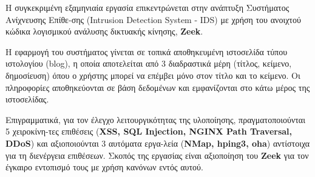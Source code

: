 Η συγκεκριμένη εξαμηνιαία εργασία επικεντρώνεται στην ανάπτυξη Συστήματος Ανίχνευσης Επίθε-σης (Intrusion Detection System - IDS) με χρήση του ανοιχτού κώδικα λογισμικού ανάλυσης δικτυακής κίνησης, \textbf{Zeek}. 

Η εφαρμογή του συστήματος γίνεται σε τοπικά αποθηκευμένη ιστοσελίδα τύπου ιστολογίου (blog), η οποία αποτελείται από 3 διαδραστικά μέρη (τίτλος, κείμενο, δημοσίευση) όπου ο χρήστης μπορεί να επέμβει μόνο στον τίτλο και το κείμενο. Οι πληροφορίες αποθηκεύονται σε βάση δεδομένων και εμφανίζονται στο κάτω μέρος της ιστοσελίδας. 

Επιγραμματικά, για τον έλεγχο λειτουργικότητας της υλοποίησης, πραγματοποιούνται 5 χειροκίνη-τες επιθέσεις (\textbf{XSS, SQL Injection, NGINX Path Traversal, DDoS}) και αξιοποιούνται 3 αυτόματα εργα-λεία (\textbf{NMap, hping3, oha}) αντίστοιχα για τη διενέργεια επιθέσεων. Σκοπός της εργασίας είναι αξιοποίηση του \textbf{Zeek} για τον έγκαιρο εντοπισμό τους με χρήση κανόνων εντός αυτού. 